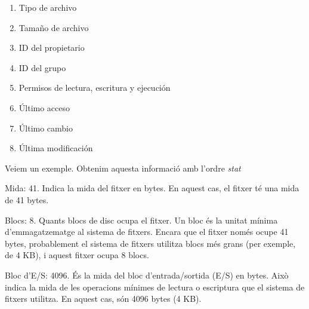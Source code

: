 \documentclass[
  12 pt,
  a4paper,
]{article}
\newenvironment{Shaded}{\begin{snugshade}}{\end{snugshade}}
\newcommand{\ErrorTok}[1]{\textcolor[rgb]{0.64,0.00,0.00}{\textbf{#1}}}
\newcommand{\ExtensionTok}[1]{#1}
\newcommand{\KeywordTok}[1]{\textcolor[rgb]{0.13,0.29,0.53}{\textbf{#1}}}
\newcommand{\NormalTok}[1]{#1}
\providecommand{\tightlist}{%
  \setlength{\itemsep}{0pt}\setlength{\parskip}{0pt}}
\begin{document}
\begin{enumerate}
\def\labelenumi{\arabic{enumi}.}
\tightlist
\item
  Tipo de archivo
\item
  Tamaño de archivo
\item
  ID del propietario
\item
  ID del grupo
\item
  Permisos de lectura, escritura y ejecución
\item
  Último acceso
\item
  Último cambio
\item
  Última modificación
\end{enumerate}

Veiem un exemple. Obtenim aquesta informació amb l'ordre \emph{stat}

\begin{Shaded}
\end{Shaded}

Mida: 41. Indica la mida del fitxer en bytes. En aquest cas, el fitxer
té una mida de 41 bytes.

Blocs: 8. Quants blocs de disc ocupa el fitxer. Un bloc és la unitat
mínima d'emmagatzematge al sistema de fitxers. Encara que el fitxer
només ocupe 41 bytes, probablement el sistema de fitxers utilitza blocs
més grans (per exemple, de 4 KB), i aquest fitxer ocupa 8 blocs.

Bloc d'E/S: 4096. És la mida del bloc d'entrada/sortida (E/S) en bytes.
Això indica la mida de les operacions mínimes de lectura o escriptura
que el sistema de fitxers utilitza. En aquest cas, són 4096 bytes (4
KB).
\end{document}
